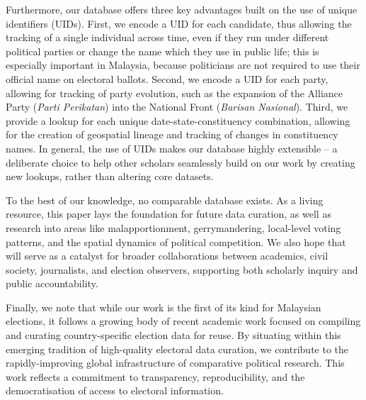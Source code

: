 \documentclass[11pt]{article}
\begin{document}
Furthermore, our database offers three key advantages built on the use of unique identifiers (UIDs). First, we encode a UID for each candidate, thus allowing the tracking of a single individual across time, even if they run under different political parties or change the name which they use in public life; this is especially important in Malaysia, because politicians are not required to use their official name on electoral ballots. Second, we encode a UID for each party, allowing for tracking of party evolution, such as the expansion of the Alliance Party (\textit{Parti Perikatan}) into the National Front (\textit{Barisan Nasional}). Third, we provide a lookup for each unique date-state-constituency combination, allowing for the creation of geospatial lineage and tracking of changes in constituency names. In general, the use of UIDs makes our database highly extensible -- a deliberate choice to help other scholars seamlessly build on our work by creating new lookups, rather than altering core datasets.

To the best of our knowledge, no comparable database exists. As a living resource, this paper lays the foundation for future data curation, as well as research into areas like malapportionment, gerrymandering, local-level voting patterns, and the spatial dynamics of political competition. We also hope that \acronym will serve as a catalyst for broader collaborations between academics, civil society, journalists, and election observers, supporting both scholarly inquiry and public accountability.

Finally, we note that while our work is the first of its kind for Malaysian elections, it follows a growing body of recent academic work focused on compiling and curating country-specific election data for reuse.\cite{perez2021spanish,baltz2022american,de2023american,calderon2025electoral,heddesheimer2025gerda,jensenius2017studying} By situating \acronym within this emerging tradition of high-quality electoral data curation, we contribute to the rapidly-improving global infrastructure of comparative political research. This work reflects a commitment to transparency, reproducibility, and the democratisation of access to electoral information.
\end{document}
